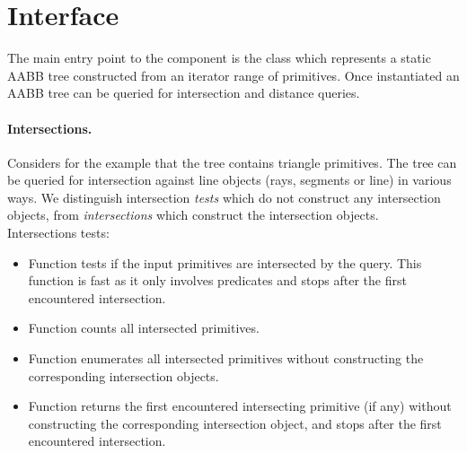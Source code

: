 \section{Interface}
\label{AABB_tree_section_interface}

The main entry point to the component is the class  which represents a static AABB tree constructed from an iterator range of primitives. Once instantiated an AABB tree can be queried for intersection and distance queries.\\


\paragraph{Intersections.} Considers for the example that the tree contains triangle primitives. The tree can be queried for intersection against line objects (rays, segments or line) in various ways. We distinguish intersection \emph{tests} which do not construct any intersection objects, from \emph{intersections} which construct the intersection objects.\\


Intersections tests:
\begin{itemize}
\item Function  tests if the input primitives are intersected by the query. This function is fast as it only involves predicates and stops after the first encountered intersection.
\item Function  counts all intersected primitives.
\item Function  enumerates all intersected primitives without constructing the corresponding intersection objects.
\item Function  returns the first encountered intersecting primitive (if any) without constructing the corresponding intersection object, and stops after the first encountered intersection.
\end{itemize}

